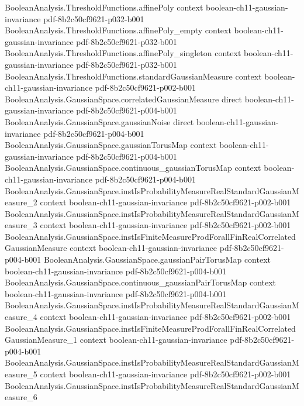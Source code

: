 \begin{theorem}
  {BooleanAnalysis.ThresholdFunctions.affinePoly}
  {context}
  {boolean-ch11-gaussian-invariance}
  {pdf-8b2c50cf9621-p032-b001}
\proofstep
  {BooleanAnalysis.ThresholdFunctions.affinePoly_empty}
  {context}
  {boolean-ch11-gaussian-invariance}
  {pdf-8b2c50cf9621-p032-b001}
\proofstep
  {BooleanAnalysis.ThresholdFunctions.affinePoly_singleton}
  {context}
  {boolean-ch11-gaussian-invariance}
  {pdf-8b2c50cf9621-p032-b001}
\proofstep
  {BooleanAnalysis.ThresholdFunctions.standardGaussianMeasure}
  {context}
  {boolean-ch11-gaussian-invariance}
  {pdf-8b2c50cf9621-p002-b001}
\proofstep
  {BooleanAnalysis.GaussianSpace.correlatedGaussianMeasure}
  {direct}
  {boolean-ch11-gaussian-invariance}
  {pdf-8b2c50cf9621-p004-b001}
\proofstep
  {BooleanAnalysis.GaussianSpace.gaussianNoise}
  {direct}
  {boolean-ch11-gaussian-invariance}
  {pdf-8b2c50cf9621-p004-b001}
\proofstep
  {BooleanAnalysis.GaussianSpace.gaussianTorusMap}
  {context}
  {boolean-ch11-gaussian-invariance}
  {pdf-8b2c50cf9621-p004-b001}
\proofstep
  {BooleanAnalysis.GaussianSpace.continuous_gaussianTorusMap}
  {context}
  {boolean-ch11-gaussian-invariance}
  {pdf-8b2c50cf9621-p004-b001}
\proofstep
  {BooleanAnalysis.GaussianSpace.instIsProbabilityMeasureRealStandardGaussianMeasure_2}
  {context}
  {boolean-ch11-gaussian-invariance}
  {pdf-8b2c50cf9621-p002-b001}
\proofstep
  {BooleanAnalysis.GaussianSpace.instIsProbabilityMeasureRealStandardGaussianMeasure_3}
  {context}
  {boolean-ch11-gaussian-invariance}
  {pdf-8b2c50cf9621-p002-b001}
\proofstep
  {BooleanAnalysis.GaussianSpace.instIsFiniteMeasureProdForallFinRealCorrelatedGaussianMeasure}
  {context}
  {boolean-ch11-gaussian-invariance}
  {pdf-8b2c50cf9621-p004-b001}
\proofstep
  {BooleanAnalysis.GaussianSpace.gaussianPairTorusMap}
  {context}
  {boolean-ch11-gaussian-invariance}
  {pdf-8b2c50cf9621-p004-b001}
\proofstep
  {BooleanAnalysis.GaussianSpace.continuous_gaussianPairTorusMap}
  {context}
  {boolean-ch11-gaussian-invariance}
  {pdf-8b2c50cf9621-p004-b001}
\proofstep
  {BooleanAnalysis.GaussianSpace.instIsProbabilityMeasureRealStandardGaussianMeasure_4}
  {context}
  {boolean-ch11-gaussian-invariance}
  {pdf-8b2c50cf9621-p002-b001}
\proofstep
  {BooleanAnalysis.GaussianSpace.instIsFiniteMeasureProdForallFinRealCorrelatedGaussianMeasure_1}
  {context}
  {boolean-ch11-gaussian-invariance}
  {pdf-8b2c50cf9621-p004-b001}
\proofstep
  {BooleanAnalysis.GaussianSpace.instIsProbabilityMeasureRealStandardGaussianMeasure_5}
  {context}
  {boolean-ch11-gaussian-invariance}
  {pdf-8b2c50cf9621-p002-b001}
\proofstep
  {BooleanAnalysis.GaussianSpace.instIsProbabilityMeasureRealStandardGaussianMeasure_6}

\end{theorem}

